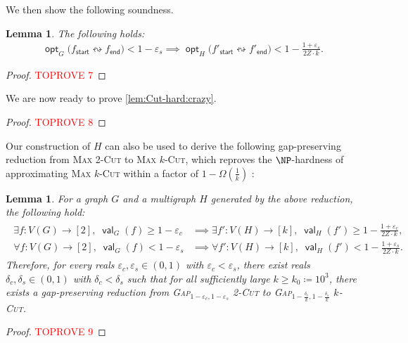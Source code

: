\documentclass[11pt,fleqn]{article}
\renewcommand{\geq}{\geqslant}
\renewcommand{\epsilon}{\varepsilon}
\newcommand{\prb}[1]{\textsc{#1}\xspace}
\newcommand{\reco}{\leftrightsquigarrow}
\newcommand{\defeq}{\coloneq}
\DeclareMathOperator{\val}{\mathsf{val}}
\DeclareMathOperator{\opt}{\mathsf{opt}}
\newcommand{\sss}{\mathsf{start}}
\newcommand{\ttt}{\mathsf{end}}
\newcommand{\f}{f}
\newcommand{\kzero}{10^3}
\newtheorem{lemma}[theorem]{Lemma}
\theoremstyle{definition}
\numberwithin{equation}{section}
\begin{document}
We then show the following soundness.


\begin{lemma}
\label{lem:Cut-hard:sound}
    The following holds\textup{:}
    \begin{align}
        \opt_G\bigl(\f_\sss \reco \f_\ttt\bigr) < 1-\epsilon_s
        \implies \opt_H\bigl(\f'_\sss \reco \f'_\ttt\bigr) < 1 - \frac{1+\epsilon_s}{2Z \cdot k}.
    \end{align}
\end{lemma}
\begin{proof}\textcolor{red}{TOPROVE 7}\end{proof}


We are now ready to prove \cref{lem:Cut-hard:crazy}.
\begin{proof}\textcolor{red}{TOPROVE 8}\end{proof}


Our construction of $H$ can also be used to derive the following gap-preserving reduction
from \prb{Max 2-Cut} to \prb{Max $k$-Cut},
which reproves the $\NP$-hardness of approximating \prb{Max $k$-Cut}
within a factor of $1 - \Omega\left(\frac{1}{k}\right)$ \cite{kann1997hardness,guruswami2013improved}:
\begin{lemma}
\label{lem:Cut-hard:KKLP97}
    For a graph $G$ and a multigraph $H$ generated by the above reduction,
    the following hold\textup{:}
    \begin{align}
    \begin{aligned}
        \exists \f \colon V(G) \to [2], \; \val_G(\f) \geq 1-\epsilon_c
        & \implies
        \exists \f' \colon V(H) \to [k], \; \val_H(\f') \geq 1 - \frac{1+\epsilon_c}{2Z \cdot k}, \\
        \forall \f \colon V(G) \to [2], \; \val_G(\f) < 1-\epsilon_s
        & \implies
        \forall \f' \colon V(H) \to [k], \; \val_H(\f') < 1 - \frac{1+\epsilon_s}{2Z \cdot k}.
    \end{aligned}
    \end{align}
    Therefore,
    for every reals $\epsilon_c,\epsilon_s \in (0,1)$ with $\epsilon_c < \epsilon_s$,
    there exist reals $\delta_c, \delta_s \in (0,1)$ with $\delta_c < \delta_s$ such that
    for all sufficiently large $k \geq k_0 \defeq \kzero$,
    there exists a gap-preserving reduction from
    \prb{Gap$_{1-\epsilon_c,1-\epsilon_s}$ 2-Cut}
    to
    \prb{Gap$_{1-\frac{\delta_c}{k},1-\frac{\delta_s}{k}}$ $k$-Cut}.
\end{lemma}
\begin{proof}\textcolor{red}{TOPROVE 9}\end{proof}
\end{document}
